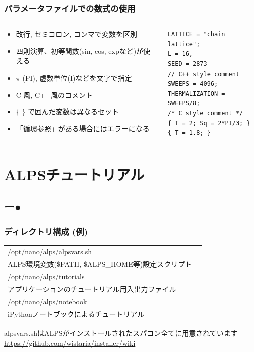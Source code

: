 \begin{frame}[t,fragile]
  \frametitle{パラメータファイルでの数式の使用}
  \begin{columns}[T]
    \begin{column}{.5\textwidth}
      \begin{itemize}
        \item 改行, セミコロン, コンマで変数を区別
        \item 四則演算、初等関数(sin, cos, expなど)が使える
        \item $\pi$ (PI), 虚数単位(I)などを文字で指定
        \item C 風, C++風のコメント
        \item \{ \} で囲んだ変数は異なるセット
        \item 「循環参照」がある場合にはエラーになる
      \end{itemize}
    \end{column}
    \begin{column}{.5\textwidth}
    \begin{lstlisting}
LATTICE = "chain lattice";
L = 16,
SEED = 2873
// C++ style comment
SWEEPS = 4096;
THERMALIZATION = SWEEPS/8;
/* C style comment */
{ T = 2; Sq = 2*PI/3; }
{ T = 1.8; }
    \end{lstlisting}
    \end{column}
  \end{columns}
\end{frame}

\section{ALPSチュートリアル}
\subsection*{{\protect\color{red}ー}{\protect\color{blue}●}}

\begin{frame}
  \frametitle{ディレクトリ構成 (例)}
  \begin{tabular}{ll}
    /opt/nano/alps/alpsvars.sh & \\
    \hspace*{3em} ALPS環境変数(\$PATH, \$ALPS\_HOME等)設定スクリプト \\
    /opt/nano/alps/tutorials & \\
    \hspace*{3em} アプリケーションのチュートリアル用入出力ファイル \\
    /opt/nano/alps/notebook & \\
    \hspace*{3em} iPythonノートブックによるチュートリアル
  \end{tabular}
  \begin{alertblock}{}
    alpsvars.shはALPSがインストールされたスパコン全てに用意されています \\
    {\footnotesize \url{https://github.com/wistaria/installer/wiki}}
\end{alertblock}
\end{frame}

